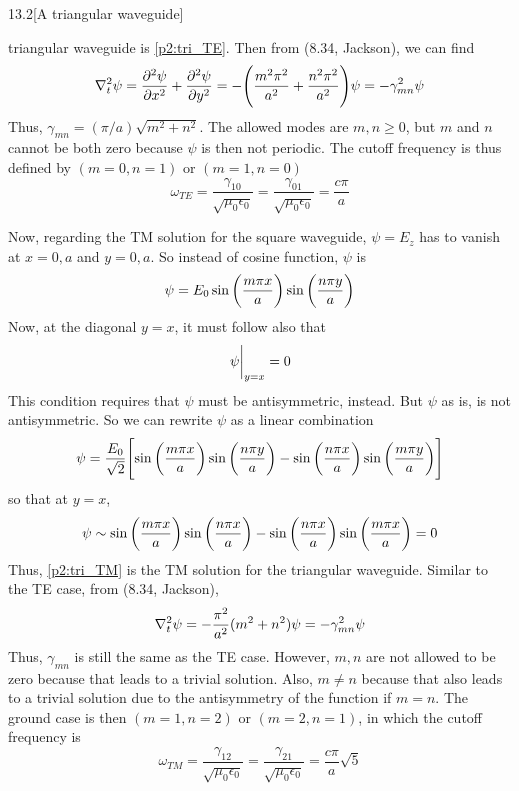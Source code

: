 \documentclass[12pt]{article}
\begin{document}
\begin{problem}{13.2}[A triangular waveguide]
\begin{solution}
triangular waveguide is \eqref{p2:tri_TE}. Then from (8.34, Jackson), we can
find
\begin{align}
    \laplacian_t\psi
    =\frac{\partial^2\psi}{\partial x^2}+\frac{\partial^2\psi}{\partial
    y^2}
    =-\qty(\frac{m^2\pi^2}{a^2}+\frac{n^2\pi^2}{a^2})\psi
    =-\gamma_{mn}^2\psi
\end{align}
Thus, $\gamma_{mn}=(\pi/a)\sqrt{m^2+n^2}$. The allowed modes are $m,n\geq0$, but
$m$ and $n$ cannot be both zero because $\psi$ is then not periodic. The cutoff
frequency is thus defined by $(m=0,n=1)$ or $(m=1,n=0)$
\begin{equation}
    \omega_{TE}=\frac{\gamma_{10}}{\sqrt{\mu_0\epsilon_0}}
    =\frac{\gamma_{01}}{\sqrt{\mu_0\epsilon_0}}
    =\frac{c\pi}{a}
\end{equation}

Now, regarding the TM solution for the square waveguide, $\psi=E_z$ has to
vanish at $x=0,a$ and $y=0,a$. So instead of cosine function, $\psi$ is
\begin{equation}
    \psi=E_0\sin\qty(\frac{m\pi x}{a})\sin\qty(\frac{n\pi y}{a}) 
\end{equation}
Now, at the diagonal $y=x$, it must follow also that
\begin{equation}
    \eval{\psi}_{y=x}=0 
\end{equation}
This condition requires that $\psi$ must be antisymmetric, instead. But $\psi$
as is, is not antisymmetric. So we can rewrite $\psi$ as a linear combination
\begin{equation}\label{p2:tri_TM}
    \psi=\frac{E_0}{\sqrt2}\qty[\sin\qty(\frac{m\pi
    x}{a})\sin\qty(\frac{n\pi y}{a})-\sin\qty(\frac{n\pi
x}{a})\sin\qty(\frac{m\pi y}{a})] 
\end{equation}
so that at $y=x$, 
\begin{equation}
    \psi\sim\sin\qty(\frac{m\pi x}{a})\sin\qty(\frac{n\pi x}{a})
    -\sin\qty(\frac{n\pi x}{a})\sin\qty(\frac{m\pi x}{a})
    =0
\end{equation}
Thus, \eqref{p2:tri_TM} is the TM solution for the triangular waveguide. Similar
to the TE case, from (8.34, Jackson),
\begin{equation}
    \laplacian_t\psi=-\frac{\pi^2}{a^2}(m^2+n^2)\psi=-\gamma_{mn}^2\psi
\end{equation}
Thus, $\gamma_{mn}$ is still the same as the TE case. However, $m,n$ are not
allowed to be zero because that leads to a trivial solution. Also, $m\neq n$
because that also leads to a trivial solution due to the antisymmetry of the
function if $m=n$. The ground case is then $(m=1,n=2)$ or $(m=2,n=1)$, in which 
the cutoff frequency is
\begin{equation}
    \omega_{TM}=\frac{\gamma_{12}}{\sqrt{\mu_0\epsilon_0}}=\frac{\gamma_{21}}{\sqrt{\mu_0\epsilon_0}}=\frac{c\pi}{a}\sqrt{5} 
\end{equation}
\end{solution}
\end{problem}
\end{document}
